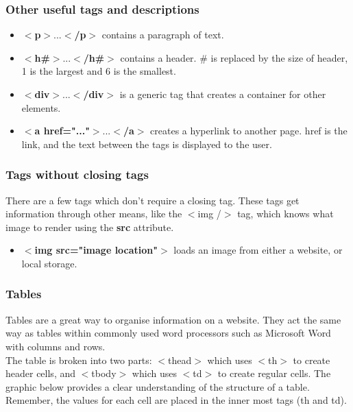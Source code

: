 \documentclass[portfolio.tex]{subfiles}
\begin{document}
				\subsubsection{Other useful tags and descriptions}
					\begin{itemize}
						\item $<$\textbf{p}$>$...$<$\textbf{/p}$>$ contains a paragraph of text.
						\item $<$\textbf{h\#}$>$...$<$\textbf{/h\#}$>$ contains a header. \# is replaced by the size of header, 1 is the largest and 6 is the smallest.
						\item $<$\textbf{div}$>$...$<$\textbf{/div}$>$ is a generic tag that creates a container for other elements.
						\item $<$\textbf{a href="..."}$>$...$<$\textbf{/a}$>$ creates a hyperlink to another page. href is the link, and the text between the tags is displayed to the user.
				\end{itemize}
				\subsubsection{\textbf{Tags without closing tags}}

						There are a few tags which don't require a closing tag. These tags get information through other means, like the $<$img /$>$ tag, which knows what image to render using the \textbf{src} attribute.
					\begin{itemize}
						\item $<$\textbf{img src="image location"}$>$ loads an image from either a website, or local storage.

					\end{itemize}

				\vspace{0.5cm}
				\subsubsection{Tables}


				Tables are a great way to organise information on a website. They act the same way as tables within commonly used word processors such as Microsoft Word with columns and rows. \\

				The table is broken into two parts: $<$thead$>$ which uses $<$th$>$ to create header cells, and $<$tbody$>$ which uses $<$td$>$ to create regular cells. The graphic below provides a clear understanding of the structure of a table. Remember, the values for each cell are placed in the inner most tags (th and td).\\
\end{document}
